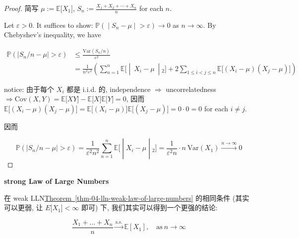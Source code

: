 \documentclass{qlnotes-export}
\begin{document}
\begin{proof}

简写 \(\mu := {\mathbb{E}}\lbrack X_{1}\rbrack\), \(S_{n} := \frac{X_{1} + X_{2} + \cdots + X_{n}}{n}\) for each \(n\).

Let \(\varepsilon > 0\). It suffices to show: \(\left. {\mathbb{P}}( \middle| S_{n} - \mu \middle| > \varepsilon)\rightarrow 0 \right.\) as \(n\rightarrow\infty\). By Chebyshev's inequality, we have

\[\begin{matrix}
{{\mathbb{P}}\left( {\left| {S_{n}/n - \mu} \right| > \varepsilon} \right)} & {\leq \frac{\text{Var}(S_{n}/n)}{\varepsilon^{2}}} \\
 & {= \frac{1}{n^{2}\varepsilon^{2}}\left( \sum\limits_{n = 1}^{n}{\mathbb{E}}\lbrack \middle| \ X_{i} - \mu\  \middle| {}_{2}\rbrack + 2\sum\limits_{1 \leq i < j \leq n}{\mathbb{E}}\lbrack(X_{i} - \mu)(X_{j} - \mu)\rbrack \right)}
\end{matrix}\]

notice: 由于每个 \(X_{i}\) 都是 i.i.d. 的, independence \(\Longrightarrow\) uncorrelatedness \(\Longrightarrow\text{Cov}(X,Y) = {\mathbb{E}}\lbrack XY\rbrack - {\mathbb{E}}\lbrack X\rbrack{\mathbb{E}}\lbrack Y\rbrack = 0\), 因而 \({\mathbb{E}}\lbrack(X_{i} - \mu)(X_{j} - \mu)\rbrack = {\mathbb{E}}\lbrack(X_{i} - \mu)\rbrack{\mathbb{E}}\lbrack(X_{j} - \mu)\rbrack = 0 \cdot 0 = 0\) for each \(i \neq j\).

因而

\[\left. {\mathbb{P}}\left( {\left| {S_{n}/n - \mu} \right| > \varepsilon} \right) = \frac{1}{\varepsilon^{2}n^{2}}\sum\limits_{n = 1}^{n}{\mathbb{E}}\lbrack \middle| X_{i} - \mu \middle| {}_{2}\rbrack = \frac{1}{\varepsilon^{2}n} \cdot n\ \text{Var}(X_{1})\overset{n\rightarrow\infty}{\rightarrow}0 \right.\]

\end{proof}

\begin{theorem}{\protect{}\label{kn-strong-law-of-large-numbers}{\textbf{strong
Law of Large Numbers}}}

在 weak LLN\hyperref[thm-04-lln-weak-law-of-large-numbers]{Theorem~\ref*{thm-04-lln-weak-law-of-large-numbers}} 的相同条件 (其实可以更弱, 让 \(E\lbrack X_{1}\rbrack < \infty\) 即可) 下, 我们其实可以得到一个更强的结论:

\[\frac{X_{1} + \ldots + X_{n}}{n}\overset{\text{a.s.}}{\rightarrow}{\mathbb{E}}\left\lbrack X_{1} \right\rbrack,\quad\text{as}\ n\rightarrow\infty\]

\end{theorem}
\end{document}
